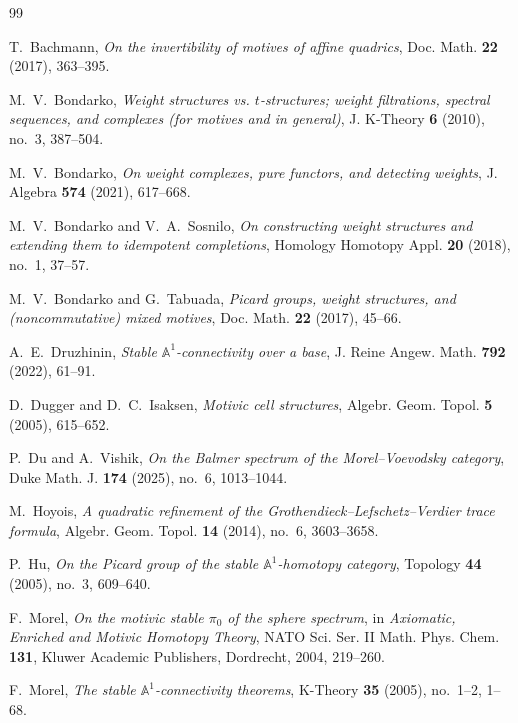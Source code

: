 \documentclass[11pt]{amsart}
\numberwithin{equation}{section}
\theoremstyle{definition}
\theoremstyle{remark}
\begin{document}
\begin{thebibliography}{99}

T.~Bachmann,
\emph{On the invertibility of motives of affine quadrics},
Doc. Math. \textbf{22} (2017), 363--395.

M.~V.~Bondarko,
\emph{Weight structures vs. $t$-structures; weight filtrations, spectral
sequences, and complexes (for motives and in general)},
J. K-Theory \textbf{6} (2010), no.~3, 387--504.

M.~V.~Bondarko,
\emph{On weight complexes, pure functors, and detecting weights},
J. Algebra \textbf{574} (2021), 617--668.

M.~V.~Bondarko and V.~A.~Sosnilo,
\emph{On constructing weight structures and extending them to idempotent
completions},
Homology Homotopy Appl. \textbf{20} (2018), no.~1, 37--57.

M.~V.~Bondarko and G.~Tabuada,
\emph{Picard groups, weight structures, and (noncommutative) mixed motives},
Doc. Math. \textbf{22} (2017), 45--66.

A.~E.~Druzhinin,
\emph{Stable $\mathbb A^1$-connectivity over a base},
J. Reine Angew. Math. \textbf{792} (2022), 61--91.

D.~Dugger and D.~C.~Isaksen,
\emph{Motivic cell structures},
Algebr. Geom. Topol. \textbf{5} (2005), 615--652.

P.~Du and A.~Vishik,
\emph{On the Balmer spectrum of the Morel--Voevodsky category},
Duke Math. J. \textbf{174} (2025), no.~6, 1013--1044.

M.~Hoyois,
\emph{A quadratic refinement of the Grothendieck--Lefschetz--Verdier trace
formula},
Algebr. Geom. Topol. \textbf{14} (2014), no.~6, 3603--3658.

P.~Hu,
\emph{On the Picard group of the stable $\mathbb A^1$-homotopy category},
Topology \textbf{44} (2005), no.~3, 609--640.

F.~Morel,
\emph{On the motivic stable $\pi_0$ of the sphere spectrum},
in \emph{Axiomatic, Enriched and Motivic Homotopy Theory},
NATO Sci. Ser. II Math. Phys. Chem. \textbf{131}, Kluwer Academic
Publishers, Dordrecht, 2004, 219--260.

F.~Morel,
\emph{The stable $\mathbb A^1$-connectivity theorems},
K-Theory \textbf{35} (2005), no.~1--2, 1--68.


\end{thebibliography}
\end{document}
